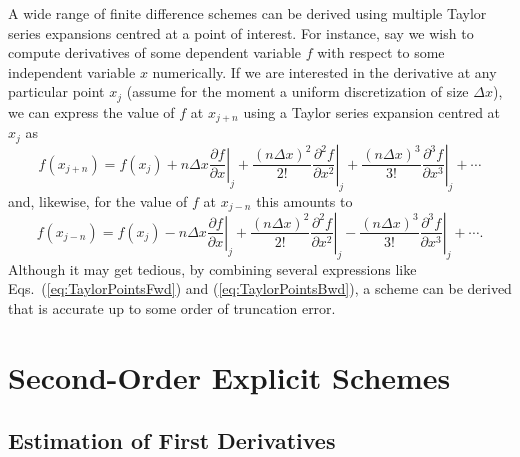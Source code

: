 \documentclass[10pt, twoside]{book}
\begin{document}
		A wide range of finite difference schemes can be derived using multiple Taylor series expansions centred at a point of interest. For instance, say we wish to compute derivatives of some dependent variable $f$ with respect to some independent variable $x$ numerically. If we are interested in the derivative at any particular point $x_j$ (assume for the moment a uniform discretization of size ${\Delta}x$), we can express the value of $f$ at $x_{j+n}$ using a Taylor series expansion centred at $x_{j}$ as
		\begin{equation}
		\label{eq:TaylorPointsFwd}
			f\left(x_{j+n}\right) = f\left(x_j\right) + n{\Delta}x\left.\frac{\partial f}{\partial x}\right|_j + \frac{\left(n{\Delta}x\right)^2}{2!}\left.\frac{\partial^2 f}{\partial x^2}\right|_j + \frac{\left(n{\Delta}x\right)^3}{3!}\left.\frac{\partial^3 f}{\partial x^3}\right|_j + \cdots
		\end{equation}
		and, likewise, for the value of $f$ at $x_{j-n}$ this amounts to
		\begin{equation}
		\label{eq:TaylorPointsBwd}
			f\left(x_{j-n}\right) = f\left(x_j\right) - n{\Delta}x\left.\frac{\partial f}{\partial x}\right|_j + \frac{\left(n{\Delta}x\right)^2}{2!}\left.\frac{\partial^2 f}{\partial x^2}\right|_j - \frac{\left(n{\Delta}x\right)^3}{3!}\left.\frac{\partial^3 f}{\partial x^3}\right|_j + \cdots.
		\end{equation}
		Although it may get tedious, by combining several expressions like Eqs.~(\ref{eq:TaylorPointsFwd}) and (\ref{eq:TaylorPointsBwd}), a scheme can be derived that is accurate up to some order of truncation error.
		
		\section{\label{sec:Order2FD}Second-Order Explicit Schemes}
			
			\subsection{\label{sec:O2FDD1}Estimation of First Derivatives}
				
\end{document}
